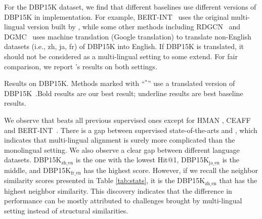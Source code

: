 For the DBP15K dataset, we find that different baselines use different versions of DBP15K in implementation. For example, BERT-INT~\cite{tang2019bert-int} uses the original multi-lingual version built by \cite{JAPE}, while some other methods including RDGCN~\cite{wu2019relation} and DGMC~\cite{fey2020deep} uses machine translation (Google translation) to translate non-English datasets (i.e., zh, ja, fr) of DBP15K into English. If DBP15K is translated, it should not be considered as a multi-lingual setting to some extend. For fair comparison, we report \solution's results on both settings.


\begin{table}[t]
	\centering
    \renewcommand\tabcolsep{3.5pt}
	\caption{Results on DBP15K. \textmd{Methods marked with ``$^*$'' use a translated version of DBP15K~\cite{xu2019cross-lingual}.Bold results are our best result; underline results are best baseline results.}}
	\renewcommand\arraystretch{0.9}
	
	\vspace{-5mm}
\end{table}

We observe that \solution beats all previous supervised ones except for HMAN \cite{yang2019aligning}, CEAFF~\cite{CEAFF} and BERT-INT~\cite{tang2019bert-int}. There is a gap between supervised state-of-the-arts and \solution, which indicates that multi-lingual alignment is surely more complicated than the monolingual setting. We also observe a clear gap between different language datasets. DBP15K$_{\text{zh\_en}}$ is the one with the lowest Hit@1, DBP15K$_{\text{ja\_en}}$ is the middle, and DBP15K$_{\text{fr\_en}}$ has the highest score. However, if we recall the neighbor similarity scores presented in Table \ref{tab:stats}, it is the DBP15K$_{\text{zh\_en}}$ that has the highest neighbor similarity. This discovery indicates that the difference in performance can be mostly attributed to challenges brought by multi-lingual setting instead of structural similarities. 


